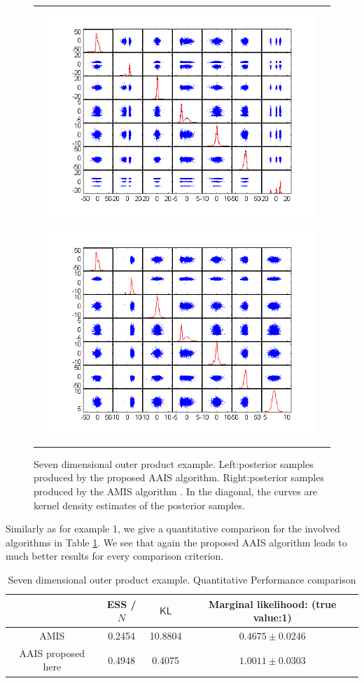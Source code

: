 \documentclass[aoas]{imsart}
\def\KL{\textsf{KL}}
\def\ESS{\textsf{ESS }}
\begin{document}
\begin{figure}[!htb]
\begin{tabular}{c}
\centerline{\includegraphics[width=4in,height=3.2in]{Fig/seven_outer_product_scatter.png}\includegraphics[width=4in,height=3.2in]{Fig/AIS_7d_outter_scatter.png}}
\end{tabular}
\caption{Seven dimensional outer product example. Left:posterior
samples produced by the proposed AAIS algorithm. Right:posterior
samples produced by the AMIS algorithm \citep{cappe2008ais}. In the
diagonal, the curves are kernel density estimates of the posterior
samples.} \label{fig:7D_scatter}
\end{figure}

Similarly as for example 1, we give a quantitative comparison for
the involved algorithms in Table \ref{comparison_7d}. We see that
again the proposed AAIS algorithm leads to much better results for
every comparison criterion.

\begin{table}
\begin{tabular}{c||c|c|c}
 & \ESS/$N$ & $\KL$ & Marginal likelihood: (true value:1) \\
\hline AMIS \citep{cappe2008ais}& 0.2454 & 10.8804 & $0.4675\pm0.0246$\\
\hline AAIS proposed here & 0.4948 & 0.4075  & $1.0011\pm0.0303$\\
\hline
\end{tabular}
\caption{Seven dimensional outer product example. Quantitative
Performance comparison}\label{comparison_7d}
\end{table}
\end{document}
